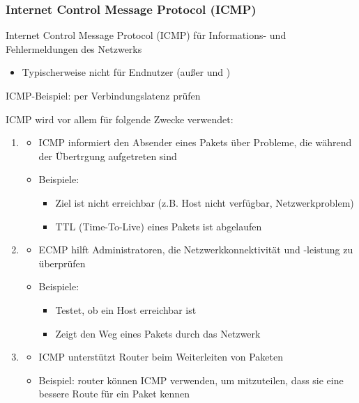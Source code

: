\subsubsection*{Internet Control Message Protocol (ICMP)}
Internet Control Message Protocol (ICMP) für Informations- und Fehlermeldungen des Netzwerks
\begin{itemize}
    \item Typischerweise nicht für Endnutzer (außer  und )
\end{itemize}
ICMP-Beispiel: per  Verbindungslatenz prüfen
\begin{infoBox}[title=Hauptaufgaben von ICMP]
    ICMP wird vor allem für folgende Zwecke verwendet:
    \begin{enumerate}
        \item {}
        \begin{itemize}
            \item ICMP informiert den Absender eines Pakets über Probleme, die während der Übertrgung aufgetreten sind
            \item Beispiele:
            \begin{itemize}
                \item Ziel ist nicht erreichbar (z.B. Host nicht verfügbar, Netzwerkproblem)
                \item TTL (Time-To-Live) eines Pakets ist abgelaufen
            \end{itemize}
        \end{itemize}
        \item {}
        \begin{itemize}
            \item ECMP hilft Administratoren, die Netzwerkkonnektivität und -leistung zu überprüfen
            \item Beispiele:
            \begin{itemize}
                \item {} Testet, ob ein Host erreichbar ist
                \item {} Zeigt den Weg eines Pakets durch das Netzwerk
            \end{itemize}
        \end{itemize}
        \item {}
        \begin{itemize}
            \item ICMP unterstützt Router beim Weiterleiten von Paketen
            \item Beispiel: router können ICMP verwenden, um mitzuteilen, dass sie eine bessere Route für ein Paket kennen
        \end{itemize}
    \end{enumerate}
\end{infoBox}
